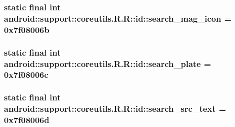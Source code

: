 \hypertarget{classandroid_1_1support_1_1coreutils_1_1_r_1_1id_6c763d4084f99f55c2e198ec7df3c472}{
\subsubsection[{search\_\-mag\_\-icon}]{\setlength{\rightskip}{0pt plus 5cm}static final int android::support::coreutils.R.R::id::search\_\-mag\_\-icon = 0x7f08006b}}
\label{classandroid_1_1support_1_1coreutils_1_1_r_1_1id_6c763d4084f99f55c2e198ec7df3c472}


\hypertarget{classandroid_1_1support_1_1coreutils_1_1_r_1_1id_efe87c667aee4791a5c335972642f086}{
\subsubsection[{search\_\-plate}]{\setlength{\rightskip}{0pt plus 5cm}static final int android::support::coreutils.R.R::id::search\_\-plate = 0x7f08006c}}
\label{classandroid_1_1support_1_1coreutils_1_1_r_1_1id_efe87c667aee4791a5c335972642f086}


\hypertarget{classandroid_1_1support_1_1coreutils_1_1_r_1_1id_9b49e149bfa2a15760423a2100d4bf45}{
\subsubsection[{search\_\-src\_\-text}]{\setlength{\rightskip}{0pt plus 5cm}static final int android::support::coreutils.R.R::id::search\_\-src\_\-text = 0x7f08006d}}
\label{classandroid_1_1support_1_1coreutils_1_1_r_1_1id_9b49e149bfa2a15760423a2100d4bf45}


